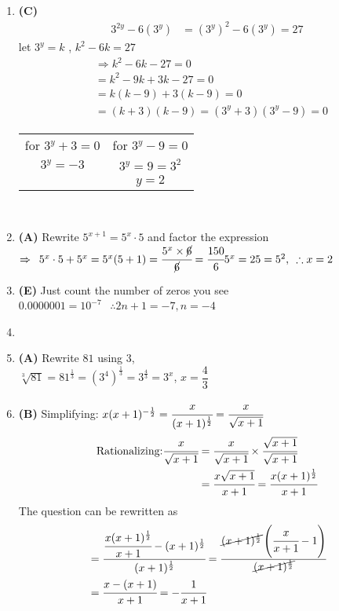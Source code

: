 \begin{multicols}{2}
\begin{enumerate}[label={\arabic*.}]
    \item \textbf{(C)} \begin{align*} 
       3^{2y} -6(3^y) & = (3^y)^2 - 6(3^y) = 27 
    \end{align*}
    let $3^y = k$ , $k^2 - 6k = 27 $
    \begin{align*} 
         & \Rightarrow k^2 - 6k -27 = 0 \\
         & = k^2 - 9k + 3k - 27 = 0 \\
         & = k(k-9)+3(k-9) = 0 \\
        &= (k+3)(k-9) = (3^y + 3)(3^y - 9) = 0
    \end{align*}
    \begin{tabular}{c|c}
        for $3^y + 3 = 0$ & for $3^y - 9 = 0$ \\
        $3^y = -3 $& $3^y = 9 = 3^2$ \\
            & $y = 2$
    \end{tabular} \\
   
    \item \textbf{(A)} Rewrite $5^{x+1} = 5^x \cdot 5$ and factor the expression 
   $ \Rightarrow \hspace{5pt} 5^{x} \cdot 5 + 5^x = 5^x (5 + 1) = \cfrac{5^x \times \cancel{6}}{\cancel{6}} = \cfrac{150}{6} \\
    5^x = 25 = 5^2  , \hspace{5pt} \therefore x = 2$ 
    \item \textbf{(E)} Just count the number of zeros you see \\
    $0.0000001 = 10^{-7}$ $ \hspace{5pt}\therefore  2n + 1 = -7, n = -4$
    \item
    \item \textbf{(A)} Rewrite $81$ using $3$, \\ $\sqrt[3]{81} = 81^{\frac{1}{3}} = (3^4)^{\frac{1}{3}} = 3^{\frac{4}{3}} = 3^x$,  $x = \dfrac{4}{3}$

    \item \textbf{(B)} Simplifying: $x(x+1)^{-\frac{1}{2}} = \cfrac{x}{(x+1)^{\frac{1}{2}}} = \cfrac{x}{\sqrt{x+1}}$ \\
    \begin{align*}
    \text{Rationalizing:} \cfrac{x}{\sqrt{x+1}} &= \cfrac{x}{\sqrt{x+1}} \times \cfrac{\sqrt{x+1}}{\sqrt{x+1}} \\
    & = \cfrac{x\sqrt{x+1}}{x+1} = \cfrac{x(x+1)^{\frac{1}{2}}}{x+1}
    \end{align*} 
    The question can be rewritten as 
    \begin{align*} 
        & = \cfrac{ \cfrac{x(x+1)^{\frac{1}{2}}}{x+1} - (x+1)^{\frac{1}{2}}}{(x+1)^{\frac{1}{2}}} 
        = \cfrac{\cancel{(x+1)^{\frac{1}{2}}}\left(\cfrac{x}{x+1} - 1\right)}{\cancel{(x+1)^{\frac{1}{2}}}} \\
        & = \cfrac{x - (x+1)}{x+1} = -\cfrac{1}{x+1}
    \end{align*}


\end{enumerate}
\end{multicols}
